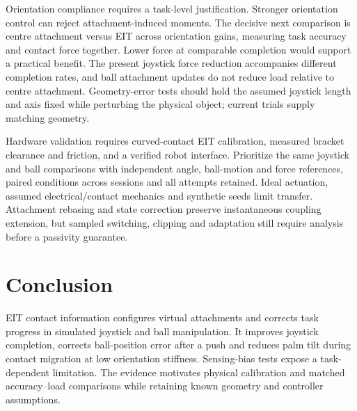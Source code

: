 \documentclass[letterpaper,10pt,conference]{IEEEtran}
\begin{document}
Orientation compliance requires a task-level justification. Stronger orientation control can reject attachment-induced moments. The decisive next comparison is centre attachment versus EIT across orientation gains, measuring task accuracy and contact force together. Lower force at comparable completion would support a practical benefit. The present joystick force reduction accompanies different completion rates, and ball attachment updates do not reduce load relative to centre attachment. Geometry-error tests should hold the assumed joystick length and axis fixed while perturbing the physical object; current trials supply matching geometry.

Hardware validation requires curved-contact EIT calibration, measured bracket clearance and friction, and a verified robot interface. Prioritize the same joystick and ball comparisons with independent angle, ball-motion and force references, paired conditions across sessions and all attempts retained. Ideal actuation, assumed electrical/contact mechanics and synthetic seeds limit transfer. Attachment rebasing and state correction preserve instantaneous coupling extension, but sampled switching, clipping and adaptation still require analysis before a passivity guarantee.

\section{Conclusion}
EIT contact information configures virtual attachments and corrects task progress in simulated joystick and ball manipulation. It improves joystick completion, corrects ball-position error after a push and reduces palm tilt during contact migration at low orientation stiffness. Sensing-bias tests expose a task-dependent limitation. The evidence motivates physical calibration and matched accuracy--load comparisons while retaining known geometry and controller assumptions.
\end{document}
